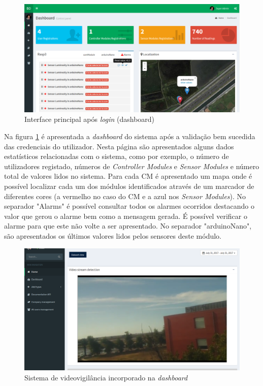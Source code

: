 \begin{figure}[h]
	\centering
	\includegraphics[width=0.9\linewidth]{prints-web/dashboard1.png}
	\caption{Interface principal após \textit{login} (dashboard)}
	\label{ddashboard}
\end{figure}



Na figura \ref{ddashboard} é apresentada a \textit{dashboard} do sistema após a validação bem sucedida das credenciais do utilizador. Nesta página são apresentados alguns dados estatísticos relacionadas com o sistema, como por exemplo, o número de utilizadores registado, números de \textit{Controller Modules} e \textit{Sensor Modules} e número total de valores lidos no sistema. Para cada \acl{CM} é apresentado um mapa onde é possível localizar cada um dos módulos identificados através de um marcador de diferentes cores (a vermelho no caso do \acl{CM} e a azul nos \textit{Sensor Modules}). No separador "Alarms" é possível consultar todos os alarmes ocorridos destacando o valor que gerou o alarme bem como a mensagem gerada. É possível verificar o alarme para que este não volte a ser apresentado. No separador "arduinoNano", são apresentados os últimos valores lidos pelos sensores deste módulo. 


\begin{figure}[h]
	\centering
	\includegraphics[width=0.7\linewidth]{prints-web/stream.png}
	\caption{Sistema de videovigilância incorporado na \textit{dashboard}}
	\label{vigilancia}
\end{figure}







